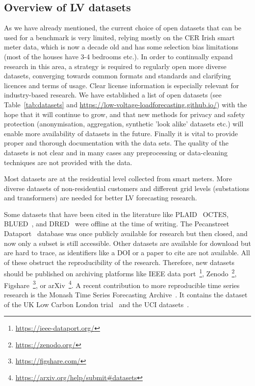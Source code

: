 \subsection{Overview of LV datasets}
As we have already mentioned, the current choice of open datasets that can be used for a benchmark is very limited, relying mostly on the CER Irish smart meter data, which is now a decade old and has some selection bias limitations (most of the houses have 3-4 bedrooms etc.). In order to continually expand research in this area, a strategy is required to regularly open more diverse datasets, converging towards common formats and standards and clarifying licences and terms of usage. Clear license information is especially relevant for industry-based research. We have established a list of open datasets (see Table~\ref{tab:datasets} and \url{https://low-voltage-loadforecasting.github.io/}) with the hope that it will continue to grow, and that new methods for privacy and safety protection (anonymisation, aggregation, synthetic 'look alike' datasets etc.) will enable more availability of datasets in the future. Finally it is vital to provide proper and thorough documentation with the data sets. The quality of the datasets is not clear and in many cases any preprocessing or data-cleaning techniques are not provided with the data.

Most datasets are at the residential level collected from smart meters. More diverse datasets of non-residential customers and different grid levels (substations and transformers) are needed for better LV forecasting research. 

Some datasets that have been cited in the literature like PLAID~\cite{Medico2020ava} OCTES, BLUED~\cite{Anderson2012baf},  and DRED~\cite{UttamaNambi2015lle} were offline at the time of writing. The Pecanstreet Dataport~\cite{Pecan2018d} database was once publicly available for research but then closed, and now only a subset is still accessible. Other datasets are available for download but are hard to trace, as identifiers like a DOI or a paper to cite are not available. All of these obstruct the reproducibility of the research. Therefore, new datasets should be published on archiving platforms like IEEE data port~\footnote{\url{https://ieee-dataport.org/}}, Zenodo~\footnote{\url{https://zenodo.org/}}, Figshare~\footnote{\url{https://figshare.com/}}, or  arXiv~\footnote{\url{https://arxiv.org/help/submit\#datasets}}. A recent contribution to more reproducible time series research is the Monash Time Series Forecasting Archive~\cite{godahewa2021mts}. It contains the dataset of the UK Low Carbon London trial~\cite{UK2014ulc} and the UCI datasets~\cite{candanedo2017ddp, Hebrail2012ihe}.


